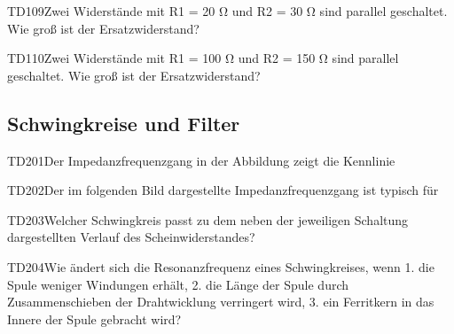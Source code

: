 \begin{question}{TD109}{Zwei Widerstände mit R1 = 20 Ω und R2 = 30 Ω sind parallel geschaltet. Wie groß ist der Ersatzwiderstand?}
\end{question}

\begin{question}{TD110}{Zwei Widerstände mit R1 = 100 Ω und R2 = 150 Ω sind parallel geschaltet. Wie groß ist der Ersatzwiderstand?}
\end{question}

\subsection{Schwingkreise und Filter}

\begin{question}{TD201}{Der Impedanzfrequenzgang in der Abbildung zeigt die Kennlinie}
\end{question}

\begin{question}{TD202}{Der im folgenden Bild dargestellte Impedanzfrequenzgang ist typisch für}
\end{question}

\begin{question}{TD203}{Welcher Schwingkreis passt zu dem neben der jeweiligen Schaltung dargestellten Verlauf des Scheinwiderstandes?}
\answer{}
\answer{}
\answer{}
\answer{}
\end{question}

\begin{question}{TD204}{Wie ändert sich die Resonanzfrequenz eines Schwingkreises, wenn 1. die Spule weniger Windungen erhält, 2. die Länge der Spule durch Zusammenschieben der Drahtwicklung verringert wird, 3. ein Ferritkern in das Innere der Spule gebracht wird?}
\end{question}

